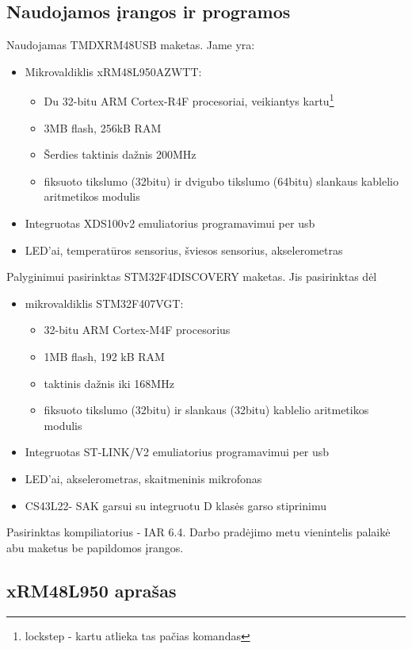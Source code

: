 \documentclass[a4paper, 12pt]{article} %
\begin{document}
\begin{onehalfspacing}
\section{Naudojamos \k{i}rangos ir programos}
Naudojamas TMDXRM48USB maketas. Jame yra:
\begin{itemize}
\item Mikrovaldiklis xRM48L950AZWTT:
\begin{itemize}
\item Du 32-bitu ARM Cortex-R4F procesoriai, veikiantys kartu\footnote{lockstep - kartu atlieka tas pa\v{c}ias komandas}
\item 3MB flash, 256kB RAM
\item \v{S}erdies taktinis da\v{z}nis 200MHz
\item fiksuoto tikslumo (32bitu) ir dvigubo tikslumo (64bitu) slankaus kablelio aritmetikos modulis
\end{itemize} 
\item Integruotas XDS100v2 emuliatorius programavimui per usb
\item LED'ai, temperat\=uros sensorius, \v{s}viesos sensorius, akselerometras
\end{itemize}
Palyginimui pasirinktas STM32F4DISCOVERY maketas. Jis pasirinktas d\.{e}l 
\begin{itemize}
\item mikrovaldiklis STM32F407VGT:
\begin{itemize}
\item 32-bitu ARM Cortex-M4F procesorius
\item 1MB flash, 192 kB RAM 
\item taktinis da\v{z}nis iki 168MHz 
\item fiksuoto tikslumo (32bitu) ir slankaus (32bitu) kablelio aritmetikos modulis
\end{itemize}
\item Integruotas ST-LINK/V2 emuliatorius programavimui per usb
\item LED'ai, akselerometras, skaitmeninis mikrofonas
\item CS43L22- SAK garsui su integruotu D klas\.es garso stiprinimu
\end{itemize}
Pasirinktas kompiliatorius - IAR 6.4. Darbo prad\.ejimo metu vienintelis palaik\.e abu maketus be papildomos \k{i}rangos. 
\subsection{xRM48L950 apra\v{s}as}
 

\end{onehalfspacing}
\end{document}
